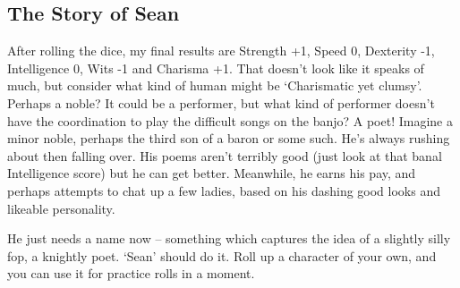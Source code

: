 \begin{figure*}[b!]

\begin{boxtext}

\subsection{The Story of Sean}

After rolling the dice, my final results are Strength +1, Speed 0, Dexterity -1, Intelligence 0, Wits -1 and Charisma +1.
That doesn't look like it speaks of much, but consider what kind of human might be `Charismatic yet clumsy'.
Perhaps a noble?
It could be a performer, but what kind of performer doesn't have the coordination to play the difficult songs on the banjo? A poet! Imagine a minor noble, perhaps the third son of a baron or some such.
He's always rushing about then falling over.
His poems aren't terribly good (just look at that banal Intelligence score) but he can get better.
Meanwhile, he earns his pay, and perhaps attempts to chat up a few ladies, based on his dashing good looks and likeable personality.

He just needs a name now -- something which captures the idea of a slightly silly fop, a knightly poet.
`Sean' should do it.
Roll up a character of your own, and you can use it for practice rolls in a moment.

\end{boxtext}

\end{figure*}
